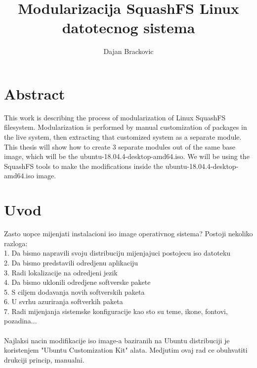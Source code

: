 \documentclass[12pt,vi]{mitthesis}
\begin{document}
\author{Dajan Brackovic}
\title{Modularizacija SquashFS Linux datotecnog sistema}

\maketitle
\tableofcontents

\chapter*{Abstract}
This work is describing the process of modularization of Linux SquashFS filesystem. Modularization is performed by manual customization of packages in the live system, then extracting that customized system as a separate module. 
\noindent
This thesis will show how to create 3 separate modules out of the same base image, which will be the ubuntu-18.04.4-desktop-amd64.iso.
\noindent
We will be using the SquashFS tools to make the modifications inside the ubuntu-18.04.4-desktop-amd64.iso image.

\chapter*{Uvod}
Zasto uopce mijenjati instalacioni iso image operativnog sistema? Postoji nekoliko razloga:\\
1. Da bismo napravili svoju distribuciju mijenjajuci postojecu iso datoteku\\
2. Da bismo predstavili odredjenu aplikaciju\\
3. Radi lokalizacije na odredjeni jezik\\
4. Da bismo uklonili odredjene softverske pakete\\
5. S ciljem dodavanja novih softverskih paketa\\
6. U svrhu azuriranja softverkih paketa\\
7. Radi mijenjanja sistemske konfiguracije kao sto su teme, ikone, fontovi, pozadina...\\
\\
Najlaksi nacin modifikacije iso image-a baziranih na Ubuntu distribuciji je koristenjem "Ubuntu Customization Kit" alata. Medjutim ovaj rad ce obuhvatiti drukciji princip, manualni.\\
\end{document}
